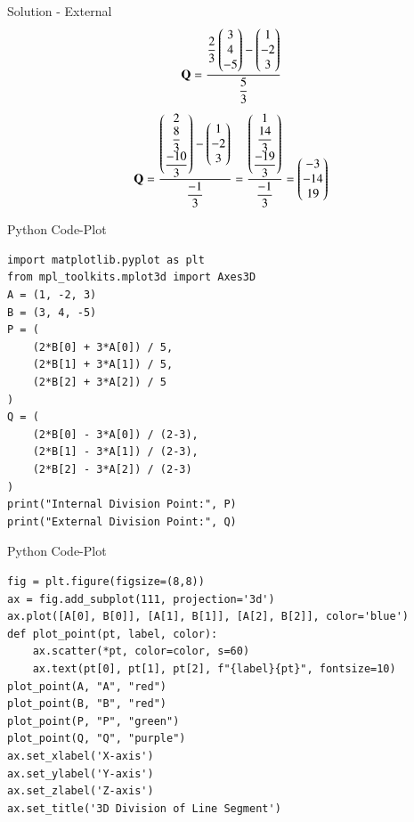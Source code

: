 \documentclass{beamer}
\begin{document}
\begin{frame}{Solution - External}
\begin{align}
\mathbf{Q} = \frac{\dfrac{2}{3}\begin{pmatrix}3 \\ 4 \\ -5\end{pmatrix} - \begin{pmatrix}1 \\ -2 \\ 3\end{pmatrix}}{\dfrac{5}{3}}
\end{align}
\begin{align}
\mathbf{Q} = \frac{\begin{pmatrix}2 \\ \dfrac{8}{3} \\ \dfrac{-10}{3}\end{pmatrix} - \begin{pmatrix}1 \\ -2 \\ 3\end{pmatrix}}{\dfrac{-1}{3}}
= \frac{\begin{pmatrix}1 \\ \dfrac{14}{3} \\ \dfrac{-19}{3}\end{pmatrix}}{\dfrac{-1}{3}}
= \begin{pmatrix}-3 \\ -14 \\ 19\end{pmatrix}
\end{align}

\end{frame}

\begin{frame}[fragile]{Python Code-Plot}
\begin{lstlisting}
import matplotlib.pyplot as plt
from mpl_toolkits.mplot3d import Axes3D
A = (1, -2, 3)
B = (3, 4, -5)
P = (
    (2*B[0] + 3*A[0]) / 5,
    (2*B[1] + 3*A[1]) / 5,
    (2*B[2] + 3*A[2]) / 5
)
Q = (
    (2*B[0] - 3*A[0]) / (2-3),
    (2*B[1] - 3*A[1]) / (2-3),
    (2*B[2] - 3*A[2]) / (2-3)
)
print("Internal Division Point:", P)
print("External Division Point:", Q)
\end{lstlisting}
\end{frame}

\begin{frame}[fragile]{Python Code-Plot}
\begin{lstlisting}
fig = plt.figure(figsize=(8,8))
ax = fig.add_subplot(111, projection='3d')
ax.plot([A[0], B[0]], [A[1], B[1]], [A[2], B[2]], color='blue')
def plot_point(pt, label, color):
    ax.scatter(*pt, color=color, s=60)
    ax.text(pt[0], pt[1], pt[2], f"{label}{pt}", fontsize=10)
plot_point(A, "A", "red")
plot_point(B, "B", "red")
plot_point(P, "P", "green")
plot_point(Q, "Q", "purple")
ax.set_xlabel('X-axis')
ax.set_ylabel('Y-axis')
ax.set_zlabel('Z-axis')
ax.set_title('3D Division of Line Segment')


\end{lstlisting}
\end{frame}
\end{document}
